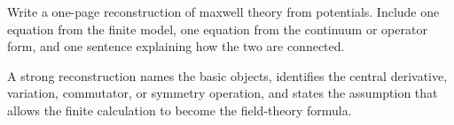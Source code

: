 \begin{exercise}
Write a one-page reconstruction of maxwell theory from potentials.  Include one equation from the finite model, one equation from the continuum or operator form, and one sentence explaining how the two are connected.
\begin{answer}
A strong reconstruction names the basic objects, identifies the central derivative, variation, commutator, or symmetry operation, and states the assumption that allows the finite calculation to become the field-theory formula.
\end{answer}
\end{exercise}
